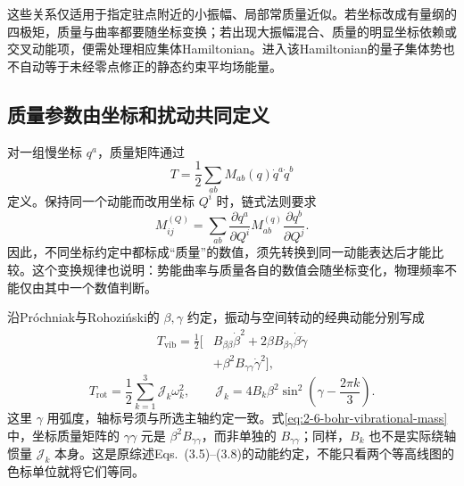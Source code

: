 这些关系仅适用于指定驻点附近的小振幅、局部常质量近似。若坐标改成有量纲的四极矩，质量与曲率都要随坐标变换；若出现大振幅混合、质量的明显坐标依赖或交叉动能项，便需处理相应集体Hamiltonian。进入该Hamiltonian的量子集体势也不自动等于未经零点修正的静态约束平均场能量。\cite[Secs.~3.1, 4.1--4.3]{prochniak-rohozinski-2009-bohr-collective-hamiltonian}

\subsection{质量参数由坐标和扰动共同定义}\label{sec:2-6-2}

对一组慢坐标 \(q^a\)，质量矩阵通过
\begin{equation}\label{eq:2-6-coordinate-mass}
T=\frac12\sum_{ab}M_{ab}(q)\dot q^a\dot q^b
\end{equation}
定义。保持同一个动能而改用坐标 \(Q^i\) 时，链式法则要求
\begin{equation}\label{eq:2-6-mass-transform}
M^{(Q)}_{ij}
=\sum_{ab}\frac{\partial q^a}{\partial Q^i}
M^{(q)}_{ab}
\frac{\partial q^b}{\partial Q^j}.
\end{equation}
因此，不同坐标约定中都标成“质量”的数值，须先转换到同一动能表达后才能比较。这个变换规律也说明：势能曲率与质量各自的数值会随坐标变化，物理频率不能仅由其中一个数值判断。

沿Próchniak与Rohoziński的 \(\beta,\gamma\) 约定，振动与空间转动的经典动能分别写成
\begin{equation}\label{eq:2-6-bohr-vibrational-mass}
\begin{aligned}
T_{\mathrm{vib}}=\frac12\bigl[
&B_{\beta\beta}\dot\beta^2
+2\beta B_{\beta\gamma}\dot\beta\dot\gamma\\
&+\beta^2 B_{\gamma\gamma}\dot\gamma^2\bigr],
\end{aligned}
\end{equation}
\begin{equation}\label{eq:2-6-bohr-rotational-mass}
T_{\mathrm{rot}}=\frac12\sum_{k=1}^3\mathcal J_k\omega_k^2,
\qquad
\mathcal J_k=4B_k\beta^2
\sin^2\!\left(\gamma-\frac{2\pi k}{3}\right).
\end{equation}
这里 \(\gamma\) 用弧度，轴标号须与所选主轴约定一致。式\eqref{eq:2-6-bohr-vibrational-mass}中，坐标质量矩阵的 \(\gamma\gamma\) 元是 \(\beta^2B_{\gamma\gamma}\)，而非单独的 \(B_{\gamma\gamma}\)；同样，\(B_k\) 也不是实际绕轴惯量 \(\mathcal J_k\) 本身。这是原综述Eqs.~(3.5)--(3.8)的动能约定，不能只看两个等高线图的色标单位就将它们等同。\cite[Eqs.~(3.5)--(3.8)]{prochniak-rohozinski-2009-bohr-collective-hamiltonian}

